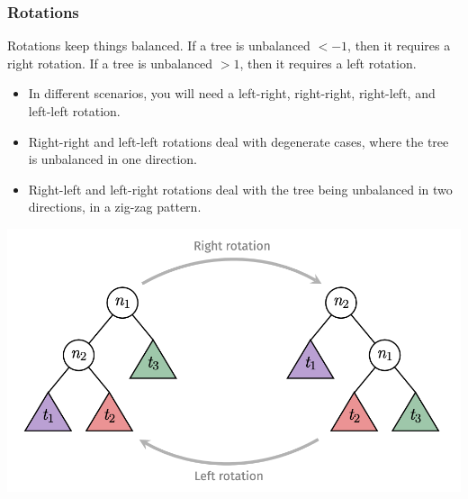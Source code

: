 \documentclass[14]{article}
\begin{document}
\subsubsection{Rotations}
Rotations keep things balanced. If a tree is unbalanced $<-1$, then it requires a right rotation.
If a tree is unbalanced $>1$, then it requires a left rotation.
\begin{itemize}
	\item In different scenarios, you will need a left-right, right-right, right-left, and left-left rotation.
	\item Right-right and left-left rotations deal with degenerate cases, where the tree is unbalanced in one direction.
	\item Right-left and left-right rotations deal with the tree being unbalanced in two directions, in a zig-zag pattern.
\end{itemize}
\begin{center}
\includegraphics[scale=0.75]{images/rotations.png}
\end{center}
\pagebreak
\end{document}
